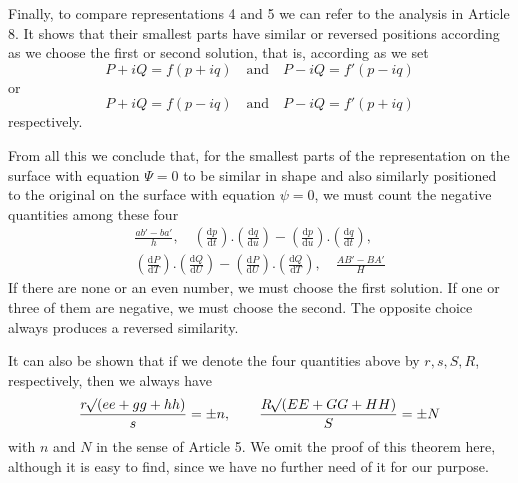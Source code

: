 Finally, to compare representations 4 and 5 we can refer to the analysis in Article 8. It shows that their smallest parts have similar or reversed positions according as we choose the first or second solution, that is, according as we set
\[
P+iQ=f(p+iq)\quad\text{and}\quad P-iQ=f'(p-iq)
\]
\noindent or
\[
P+iQ=f(p-iq)\quad\text{and}\quad P-iQ=f'(p+iq)
\]
\noindent respectively.

From all this we conclude that, for the smallest parts of the representation on the surface with equation \(\Psi=0\) to be similar in shape and also similarly positioned to the original on the surface with equation \(\psi=0\), we must count the negative quantities among these four
\[
\begin{gathered}
\frac{ab'-ba'}{h},\quad (\frac{\mathrm{d}p}{\mathrm{d}t})\mathord{.}(\frac{\mathrm{d}q}{\mathrm{d}u})-(\frac{\mathrm{d}p}{\mathrm{d}u})\mathord{.}(\frac{\mathrm{d}q}{\mathrm{d}t}),\\
(\frac{\mathrm{d}P}{\mathrm{d}T})\mathord{.}(\frac{\mathrm{d}Q}{\mathrm{d}U})-(\frac{\mathrm{d}P}{\mathrm{d}U})\mathord{.}(\frac{\mathrm{d}Q}{\mathrm{d}T}),\quad \frac{AB'-BA'}{H}
\end{gathered}
\]
\noindent If there are none or an even number, we must choose the first solution. If one or three of them are negative, we must choose the second. The opposite choice always produces a reversed similarity.
\par\indent{}%
It can also be shown that if we denote the four quantities above by \(r,s,S,R\), respectively, then we always have
\[
\frac{r\mathord{{}^{}\!\surd}(ee+gg+hh)}{s}=\pm n,\qquad\frac{R\mathord{{}^{}\!\surd}(EE+GG+HH)}{S}=\pm N
\]
\noindent with \(n\) and \(N\) in the sense of Article 5. We omit the proof of this theorem here, although it is easy to find, since we have no further need of it for our purpose.

